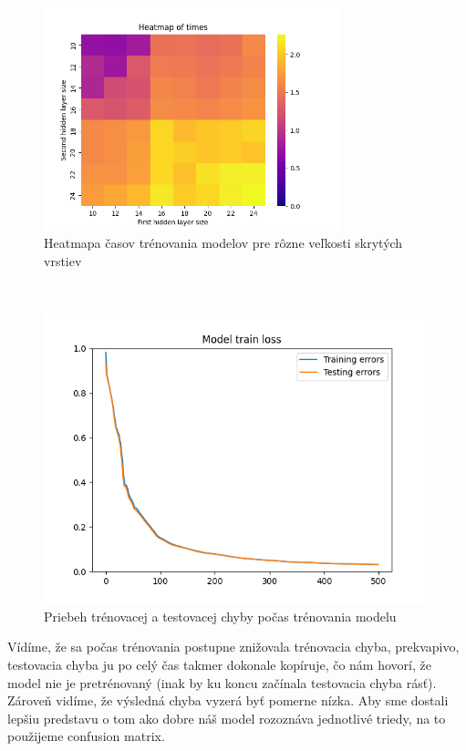 \documentclass[a4paper]{article}
\begin{document}
	\begin{figure}[!h]
		\centering
		\includegraphics[width=0.77\textwidth]{../heatmap_time.png}
		\caption{Heatmapa časov trénovania modelov pre rôzne veľkosti skrytých vrstiev}
	\end{figure}

	
	\\
	
	\begin{figure}[!h]
		\centering
		\includegraphics[width=\textwidth]{../errors.png}
		\caption{Priebeh trénovacej a testovacej chyby počas trénovania modelu }
	\end{figure}
	 
	Vídíme, že sa počas trénovania postupne znižovala trénovacia chyba, prekvapivo, testovacia chyba ju po celý čas takmer dokonale kopíruje, čo nám hovorí, že model nie je pretrénovaný (inak by ku koncu začínala testovacia chyba rásť). Zároveň vidíme, že výsledná chyba vyzerá byť pomerne nízka. Aby sme dostali lepšiu predstavu o tom ako dobre náš model rozoznáva jednotlivé triedy, na to použijeme confusion matrix.
	
\end{document}
